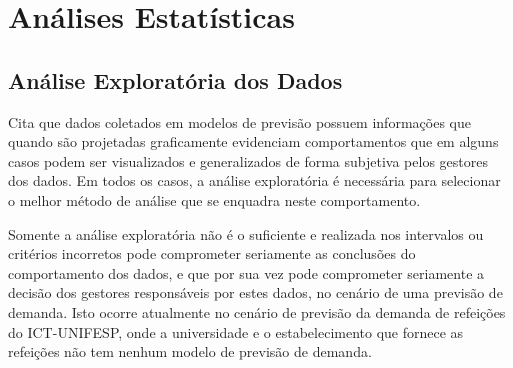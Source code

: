 \documentclass[	12pt, Times, openright, twoside, a4paper, english, brazil]{abntex2}
\begin{document}





      \section{Análises Estatísticas}
        \subsection{Análise Exploratória dos Dados}
          \cite{Junior2007} Cita que dados coletados em modelos de previsão possuem informações que quando são projetadas graficamente evidenciam comportamentos que em alguns casos podem ser visualizados e generalizados de forma subjetiva pelos gestores dos dados.  
          Em todos os casos, a análise exploratória é necessária para selecionar o melhor método de análise que se enquadra neste comportamento.

          Somente a análise exploratória não é o suficiente e realizada nos intervalos ou critérios incorretos pode comprometer seriamente as conclusões do comportamento dos dados, e que por sua vez pode comprometer seriamente a decisão dos gestores responsáveis por estes dados, no cenário de uma previsão de demanda. 
          Isto ocorre atualmente no cenário de previsão da demanda de refeições do ICT-UNIFESP, onde a universidade e o estabelecimento que fornece as refeições não tem nenhum modelo de previsão de demanda. 
\end{document}
